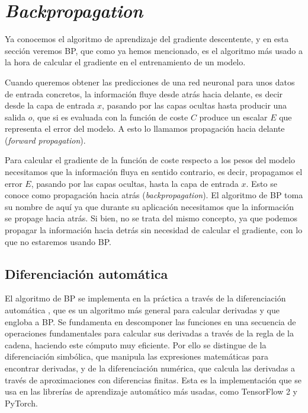 \section{\textit{Backpropagation}}
Ya conocemos el algoritmo de aprendizaje del gradiente descentente, y en esta sección veremos BP, que como ya hemos mencionado, es el algoritmo más usado a la hora de calcular el gradiente en el entrenamiento de un modelo. 

Cuando queremos obtener las predicciones de una red neuronal para unos datos de entrada concretos, la información fluye desde atrás hacia delante, es decir desde la capa de entrada $x$, pasando por las capas ocultas hasta producir una salida $o$, que si es evaluada con la función de coste $C$ produce un escalar $E$ que representa el error del modelo. A esto lo llamamos propagación hacia delante (\textit{forward propagation}).

Para calcular el gradiente de la función de coste respecto a los pesos del modelo necesitamos que la información fluya en sentido contrario, es decir, propagamos el error $E$, pasando por las capas ocultas, hasta la capa de entrada $x$. Esto se conoce como propagación hacia atrás (\textit{backpropagation}). El algoritmo de BP toma su nombre de aquí ya que durante su aplicación necesitamos que la información se propage hacia atrás. Si bien, no se trata del mismo concepto, ya que podemos propagar la información hacia detrás sin necesidad de calcular el gradiente, con lo que no estaremos usando BP.






\subsection{Diferenciación automática}

El algoritmo de BP se implementa en la práctica a través de la diferenciación automática \cite{AutomaticDiff}, que es un algoritmo más general para calcular derivadas y que engloba a BP. Se fundamenta en descomponer las funciones en una secuencia de operaciones fundamentales para calcular sus derivadas a través de la regla de la cadena, haciendo este cómputo muy eficiente. Por ello se distingue de la diferenciación simbólica, que manipula las expresiones matemáticas para encontrar derivadas, y de la diferenciación numérica, que calcula las derivadas a través de aproximaciones con diferencias finitas. Esta es la implementación que se usa en las librerías de aprendizaje automático más usadas, como TensorFlow 2 y PyTorch.

